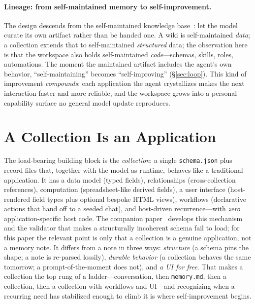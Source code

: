 \documentclass[11pt]{article}
\newcommand{\code}[1]{\texttt{\small #1}}
\begin{document}
\paragraph{Lineage: from self-maintained memory to self-improvement.}
The design descends from the self-maintained knowledge base~\citep{karpathy2025kb}:
let the model curate its own artifact rather than be handed one. A wiki is
self-maintained \emph{data}; a collection extends that to self-maintained
\emph{structured} data; the observation here is that the workspace also holds
self-maintained \emph{code}---schemas, skills, roles, automations. The moment the
maintained artifact includes the agent's own behavior, ``self-maintaining'' becomes
``self-improving'' (\S\ref{sec:loop}). This kind of improvement \emph{compounds}:
each application the agent crystallizes makes the next interaction faster and more
reliable, and the workspace grows into a personal capability surface no general
model update reproduces.

\section{A Collection Is an Application}
\label{sec:collection}

The load-bearing building block is the \emph{collection}: a single
\code{schema.json} plus record files that, together with the model as runtime,
behaves like a traditional application. It has a data model (typed fields),
relationships (cross-collection references), computation (spreadsheet-like derived
fields), a user interface (host-rendered field types plus optional bespoke HTML
views), workflows (declarative actions that hand off to a seeded chat), and
host-driven recurrence---with \emph{zero} application-specific host code. The
companion paper~\citep{nakajima2026dsl} develops this mechanism and the validator
that makes a structurally incoherent schema fail to load; for this paper the
relevant point is only that a collection is a genuine application, not a memory
note. It differs from a note in three ways: \emph{structure} (a schema pins the
shape; a note is re-parsed lossily), \emph{durable behavior} (a collection behaves
the same tomorrow; a prompt-of-the-moment does not), and \emph{a UI for free}. That
makes a collection the top rung of a ladder---conversation, then \code{memory.md},
then a collection, then a collection with workflows and UI---and recognizing when a
recurring need has stabilized enough to climb it is where self-improvement begins.
\end{document}
